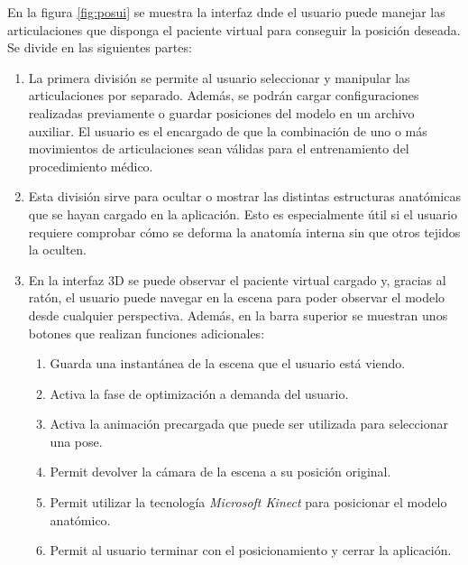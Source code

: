 En la figura \ref{fig:posui} se muestra la interfaz dnde el usuario puede manejar las articulaciones que disponga el paciente virtual para conseguir la posición deseada. Se divide en las siguientes partes: 
\begin{enumerate}
    \item La primera división se permite al usuario seleccionar y manipular las articulaciones por separado. %
    Además, se podrán cargar configuraciones realizadas previamente o guardar posiciones del modelo en un archivo auxiliar. El usuario es el encargado de que la combinación de uno o más movimientos de articulaciones sean válidas para el entrenamiento del procedimiento médico. 
    \item Esta división sirve para ocultar o mostrar las distintas estructuras anatómicas que se hayan cargado en la aplicación. Esto es especialmente útil si el usuario requiere comprobar cómo se deforma la anatomía interna sin que otros tejidos la oculten. %
    \item En la interfaz 3D se puede observar el paciente virtual cargado y, gracias al ratón, el usuario puede navegar en la escena para poder observar el modelo desde cualquier perspectiva. Además, en la barra superior se muestran unos botones que realizan funciones adicionales:
    \begin{enumerate}
   \item Guarda una instantánea de la escena que el usuario está viendo. 
   \item Activa la fase de optimización a demanda del usuario. 
   \item Activa la animación precargada que puede ser utilizada para seleccionar una pose. 
   \item Permit devolver la cámara de la escena a su posición original. 
   \item Permit utilizar la tecnología \emph{Microsoft Kinect} para posicionar el modelo anatómico.
   \item   Permit al usuario terminar con el posicionamiento y cerrar la aplicación.
    \end{enumerate}
    
\end{enumerate}




